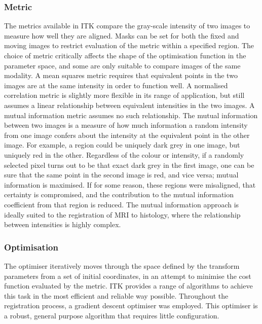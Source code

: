     \subsubsection{Metric} %
    \label{ssub:metric}
      The metrics available in ITK compare the gray-scale intensity of two images to measure how well they are aligned. Masks can be set for both the fixed and moving images to restrict evaluation of the metric within a specified region. The choice of metric critically affects the shape of the optimisation function in the parameter space, and some are only suitable to compare images of the same modality. A mean squares metric requires that equivalent points in the two images are at the same intensity in order to function well. A normalised correlation metric is slightly more flexible in its range of application, but still assumes a linear relationship between equivalent intensities in the two images. A mutual information metric assumes no such relationship. The mutual information between two images is a measure of how much information a random intensity from one image confers about the intensity at the equivalent point in the other image. For example, a region could be uniquely dark grey in one image, but uniquely red in the other. Regardless of the colour or intensity, if a randomly selected pixel turns out to be that exact dark grey in the first image, one can be sure that the same point in the second image is red, and vice versa; mutual information is maximised. If for some reason, these regions were misaligned, that certainty is compromised, and the contribution to the mutual information coefficient from that region is reduced. The mutual information approach is ideally suited to the registration of MRI to histology, where the relationship between intensities is highly complex.
    
    \subsubsection{Optimisation} %
    \label{ssub:optimisation}
      The optimiser iteratively moves through the space defined by the transform parameters from a set of initial coordinates, in an attempt to minimise the cost function evaluated by the metric. ITK provides a range of algorithms to achieve this task in the most efficient and reliable way possible. Throughout the registration process, a gradient descent optimiser was employed. This optimiser is a robust, general purpose algorithm that requires little configuration.
  
